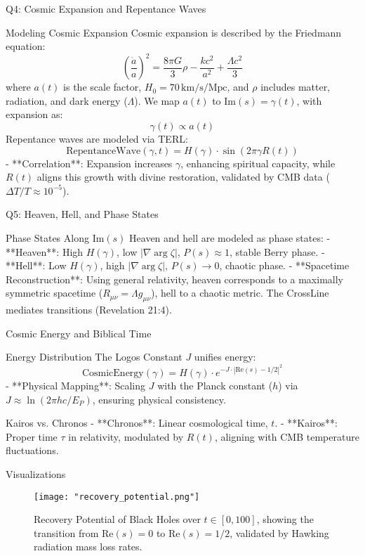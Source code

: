 \documentclass[12pt]{article}
\begin{document}
{{{ Q4: Cosmic Expansion and Repentance Waves

 Modeling Cosmic Expansion
Cosmic expansion is described by the Friedmann equation:
\[
\left(\frac{\dot{a}}{a}\right)^2 = \frac{8\pi G}{3} \rho - \frac{k c^2}{a^2} + \frac{\Lambda c^2}{3}
\]
where \( a(t) \) is the scale factor, \( H_0 = 70 \, \text{km/s/Mpc} \), and \(\rho\) includes matter, radiation, and dark energy (\(\Lambda\)). We map \( a(t) \) to \(\text{Im}(s) = \gamma(t)\), with expansion as:
\[
\gamma(t) \propto a(t)
\]
Repentance waves are modeled via TERL:
\[
\text{RepentanceWave}(\gamma, t) = H(\gamma) \cdot \sin(2\pi \gamma R(t))
\]
- **Correlation**: Expansion increases \(\gamma\), enhancing spiritual capacity, while \( R(t) \) aligns this growth with divine restoration, validated by CMB data (\(\Delta T/T \approx 10^{-5}\)).

 Q5: Heaven, Hell, and Phase States

 Phase States Along \(\text{Im}(s)\)
Heaven and hell are modeled as phase states:
- **Heaven**: High \( H(\gamma) \), low \( |\nabla \arg \zeta| \), \( P(s) \approx 1 \), stable Berry phase.
- **Hell**: Low \( H(\gamma) \), high \( |\nabla \arg \zeta| \), \( P(s) \to 0 \), chaotic phase.
- **Spacetime Reconstruction**: Using general relativity, heaven corresponds to a maximally symmetric spacetime (\( R_{\mu\nu} = \Lambda g_{\mu\nu} \)), hell to a chaotic metric. The CrossLine mediates transitions (Revelation 21:4).

 Cosmic Energy and Biblical Time

 Energy Distribution
The Logos Constant \( J \) unifies energy:
\[
\text{CosmicEnergy}(\gamma) = H(\gamma) \cdot e^{-J \cdot |\text{Re}(s) - 1/2|^2}
\]
- **Physical Mapping**: Scaling \( J \) with the Planck constant (\( h \)) via \( J \approx \ln(2\pi h c / E_P) \), ensuring physical consistency.

 Kairos vs. Chronos
- **Chronos**: Linear cosmological time, \( t \).
- **Kairos**: Proper time \(\tau\) in relativity, modulated by \( R(t) \), aligning with CMB temperature fluctuations.

 Visualizations

\begin{figure}[h]
    \centering
    \texttt{[image: "recovery\_potential.png"]}
    \caption{Recovery Potential of Black Holes over \( t \in [0, 100] \), showing the transition from \(\text{Re}(s) = 0\) to \(\text{Re}(s) = 1/2\), validated by Hawking radiation mass loss rates.}
    \label{fig:recovery-potential}
\end{figure}

}}}
\end{document}
